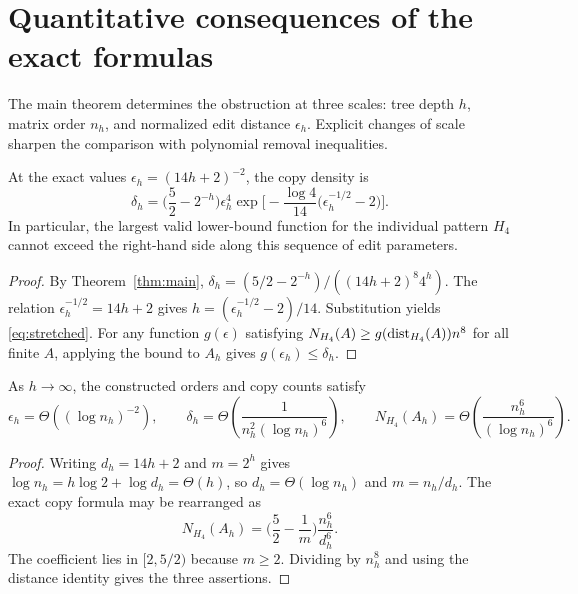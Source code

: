 \section{Quantitative consequences of the exact formulas}\label{sec:quantitative}
The main theorem determines the obstruction at three scales: tree
depth $h$, matrix order $n_h$, and normalized edit distance
$\epsilon_h$.  Explicit changes of scale sharpen the comparison
with polynomial removal inequalities.

\begin{proposition}
\label{prop:stretched}
At the exact values $\epsilon_h=(14h+2)^{-2}$, the copy density is
\begin{equation}\label{eq:stretched}
 \delta_h=\biggl(\frac52-2^{-h}\biggr)\epsilon_h^4
    \exp\biggl[-\frac{\log 4}{14}
                   \bigl(\epsilon_h^{-1/2}-2\bigr)\biggr].
\end{equation}
In particular, the largest valid lower-bound function for the
individual pattern $H_4$ cannot exceed the right-hand side along
this sequence of edit parameters.
\end{proposition}
\begin{proof}
By Theorem~\ref{thm:main},
$\delta_h=(5/2-2^{-h})/((14h+2)^8 4^h)$.
The relation $\epsilon_h^{-1/2}=14h+2$ gives
$h=(\epsilon_h^{-1/2}-2)/14$. Substitution yields
\eqref{eq:stretched}. For any function $g(\epsilon)$ satisfying
$N_{H_4}(A)\ge g(\operatorname{dist}_{H_4}(A))n^8$ for all finite $A$,
applying the bound to $A_h$ gives $g(\epsilon_h)\le\delta_h$.
\end{proof}

\begin{proposition}\label{prop:byorder}
As $h\to\infty$, the constructed orders and copy counts satisfy
\[
 \epsilon_h=\Theta((\log n_h)^{-2}),\qquad
 \delta_h=\Theta\!\left(\frac1{n_h^2(\log n_h)^6}\right),
 \qquad
 N_{H_4}(A_h)=\Theta\!\left(\frac{n_h^6}{(\log n_h)^6}\right).
\]
\end{proposition}
\begin{proof}
Writing $d_h=14h+2$ and $m=2^h$ gives
$\log n_h=h\log2+\log d_h=\Theta(h)$, so
$d_h=\Theta(\log n_h)$ and $m=n_h/d_h$.
The exact copy formula may be rearranged as
\[
 N_{H_4}(A_h)=\biggl(\frac52-\frac1m\biggr)
                    \frac{n_h^6}{d_h^6}.
\]
The coefficient lies in $[2,5/2)$ because $m\ge2$.
Dividing by $n_h^8$ and using the distance identity gives the three
assertions.
\end{proof}

